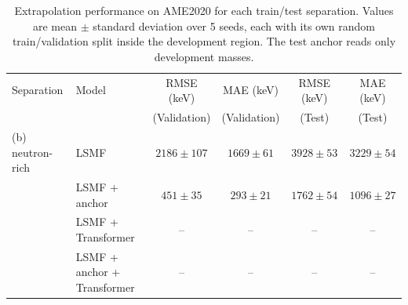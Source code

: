 \begin{table}[htbp]\centering
\caption{Extrapolation performance on AME2020 for each train/test separation. Values are mean $\pm$ standard deviation over 5 seeds, each with its own random train/validation split inside the development region. The test anchor reads only development masses.}
\label{tab:extrapolation}
\begin{tabular}{llcccc}\hline\hline
Separation & Model & RMSE (keV) & MAE (keV) & RMSE (keV) & MAE (keV) \\
 & & (Validation) & (Validation) & (Test) & (Test) \\ \hline
(b) neutron-rich & LSMF & $2186 \pm 107$ & $1669 \pm 61$ & $3928 \pm 53$ & $3229 \pm 54$ \\
 & LSMF + anchor & $451 \pm 35$ & $293 \pm 21$ & $1762 \pm 54$ & $1096 \pm 27$ \\
 & LSMF + Transformer & -- & -- & -- & -- \\
 & LSMF + anchor + Transformer & -- & -- & -- & -- \\
\hline
\hline\end{tabular}\end{table}
